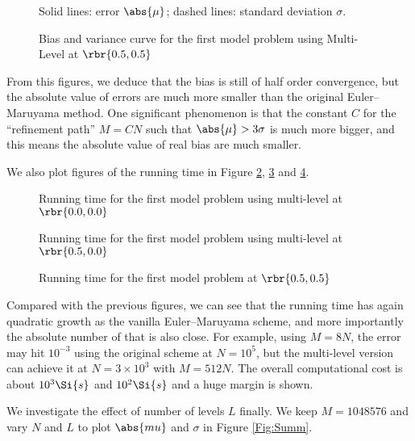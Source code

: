 \documentclass[english, nochinese]{pnote}
\begin{document}
\begin{figure}[htbp]
{
\centering

\caption{Bias and variance curve for the first model problem using Multi-Level at $ \rbr{ 0.5, 0.5 } $}
\label{Fig:ML13}
}
{
\footnotesize Solid lines: error $\abs{\mu}$; dashed lines: standard deviation $\sigma$.
}
\end{figure}

From this figures, we deduce that the bias is still of half order convergence, but the absolute value of errors are much more smaller than the original Euler--Maruyama method. One significant phenomenon is that the constant $C$ for the ``refinement path'' $ M = C N $ such that $ \abs{\mu} > 3 \sigma $ is much more bigger, and this means the absolute value of real bias are much smaller.

We also plot figures of the running time in Figure \ref{Fig:LMTime11}, \ref{Fig:LMTime12} and \ref{Fig:LMTime13}.

\begin{figure}[htbp]
\centering

\caption{Running time for the first model problem using multi-level at $ \rbr{ 0.0, 0.0 } $}
\label{Fig:LMTime11}
\end{figure}

\begin{figure}[htbp]
\centering

\caption{Running time for the first model problem using multi-level at $ \rbr{ 0.5, 0.0 } $}
\label{Fig:LMTime12}
\end{figure}

\begin{figure}[htbp]
\centering

\caption{Running time for the first model problem at $ \rbr{ 0.5, 0.5 } $}
\label{Fig:LMTime13}
\end{figure}

Compared with the previous figures, we can see that the running time has again quadratic growth as the vanilla Euler--Maruyama scheme, and more importantly the absolute number of that is also close. For example, using $ M = 8 N $, the error may hit $10^{-3}$ using the original scheme at $ N = 10^5 $, but the multi-level version can achieve it at $ N = 3 \times 10^3 $ with $ M = 512 N $. The overall computational cost is about $10^3\Si{s}$ and $10^2\Si{s}$ and a huge margin is shown.

We investigate the effect of number of levels $L$ finally. We keep $ M = 1048576 $ and vary $N$ and $L$ to plot $\abs{mu}$ and $\sigma$ in Figure \ref{Fig:Summ}.
\end{document}
